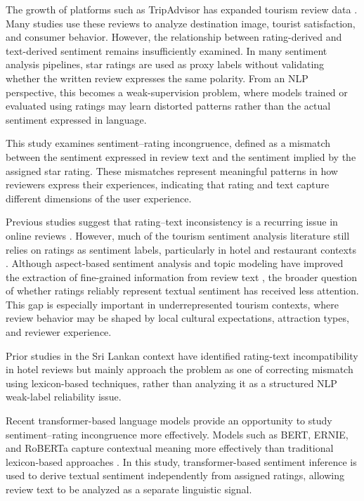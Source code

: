 \documentclass[conference]{IEEEtran}
\begin{document}
The growth of platforms such as TripAdvisor has expanded tourism review data \cite{George}. Many studies use these reviews to analyze destination image, tourist satisfaction, and consumer behavior. However, the relationship between rating-derived and text-derived sentiment remains insufficiently examined. In many sentiment analysis pipelines, star ratings are used as proxy labels without validating whether the written review expresses the same polarity. From an NLP perspective, this becomes a weak-supervision problem, where models trained or evaluated using ratings may learn distorted patterns rather than the actual sentiment expressed in language.

This study examines sentiment--rating incongruence, defined as a mismatch between the sentiment expressed in review text and the sentiment implied by the assigned star rating. These mismatches represent meaningful patterns in how reviewers express their experiences, indicating that rating and text capture different dimensions of the user experience.

Previous studies suggest that rating--text inconsistency is a recurring issue in online reviews \cite{Bigne,Kwon}. However, much of the tourism sentiment analysis literature still relies on ratings as sentiment labels, particularly in hotel and restaurant contexts \cite{alaei,Ameur}. Although aspect-based sentiment analysis and topic modeling have improved the extraction of fine-grained information from review text \cite{Chu2022,Ali}, the broader question of whether ratings reliably represent textual sentiment has received less attention. This gap is especially important in underrepresented tourism contexts, where review behavior may be shaped by local cultural expectations, attraction types, and reviewer experience.

Prior studies in the Sri Lankan context have identified rating-text incompatibility in hotel reviews but mainly approach the problem as one of correcting mismatch using lexicon-based techniques, rather than analyzing it as a structured NLP weak-label reliability issue.

Recent transformer-based language models provide an opportunity to study sentiment--rating incongruence more effectively. Models such as BERT, ERNIE, and RoBERTa capture contextual meaning more effectively than traditional lexicon-based approaches \cite{Wen,Puh,Devlin,Sun}. In this study, transformer-based sentiment inference is used to derive textual sentiment independently from assigned ratings, allowing review text to be analyzed as a separate linguistic signal.
\end{document}
